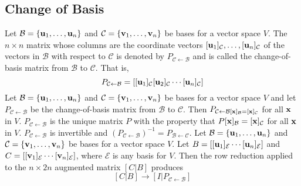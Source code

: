 \documentclass{article}
\begin{document}
        \subsection{Change of Basis}
        \begin{outline}
            \1 Let \(\mathcal B=\{\vb u_1,\ldots,\vb u_n\}\) and \(\mathcal C=\{\vb v_1,\ldots,\vb v_n\}\) be bases for a vector space $V$. The \(n\times n\) matrix whose columns are the coordinate vectors \([\vb u_1]_\mathcal C,\ldots,[\vb u_n]_\mathcal C\) of the vectors in \(\mathcal B\) with respect to \(\mathcal C\) is denoted by \(P_{\mathcal C\leftarrow\mathcal B}\) and is called the change-of-basis matrix from \(\mathcal B\) to \(\mathcal C\). That is, \[P_{\mathcal C\leftarrow\mathcal B}=[[\vb u_1]_\mathcal C[\vb u_2]_\mathcal C\cdots[\vb u_n]_\mathcal C]\]
            \1 Let \(\mathcal B=\{\vb u_1,\ldots,\vb u_n\}\) and \(\mathcal C=\{\vb v_1,\ldots,\vb v_n\}\) be bases for a vector space $V$ and let \(P_{\mathcal C\leftarrow\mathcal B}\) be the change-of-basis matrix from \(\mathcal B\) to \(\mathcal C\). Then 
                \2 \(P_{\mathcal C\leftarrow\mathcal B[\vb x]_\mathcal B=[\vb x]_\mathcal{C}}\) for all \(\vb x\) in $V$. 
                \2 \(P_{\mathcal C\leftarrow\mathcal B}\) is the unique matrix $P$ with the property that \(P[\vb x]_\mathcal B=[\vb x]_\mathcal C\) for all \(\vb x\) in $V$. 
                \2 \(P_{\mathcal C\leftarrow\mathcal B}\) is invertible and \((P_{\mathcal C\leftarrow\mathcal B})^{-1}=P_{\mathcal B\leftarrow\mathcal C}\). 
            \1 Let \(\mathcal B=\{\vb u_1,\ldots,\vb u_n\}\) and \(\mathcal C=\{\vb v_1,\ldots,\vb v_n\}\) be bases for a vector space $V$. Let \(B=[[\vb u_1]_\mathcal E\cdots[\vb u_n]_\mathcal E]\) and \(C=[[\vb v_1]_\mathcal E\cdots[\vb v_n]_\mathcal E]\), where \(\mathcal E\) is any basis for $V$. Then the row reduction applied to the \(n\times 2n\) augmented matrix \([C|B]\) produces \[[C|B]\to[I|P_{\mathcal C\leftarrow\mathcal B}]\]

        \end{outline}
\end{document}
